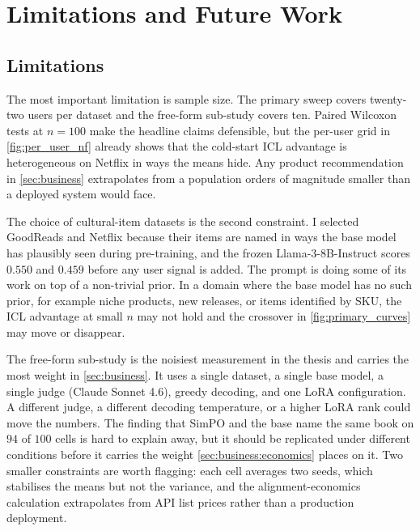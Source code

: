 
\section{Limitations and Future Work}
\label{sec:limits}

\subsection{Limitations}
\label{sec:limits:lim}

The most important limitation is sample size. The primary sweep covers twenty-two users per dataset and the free-form sub-study covers ten. Paired Wilcoxon tests at $n = 100$ make the headline claims defensible, but the per-user grid in \cref{fig:per_user_nf} already shows that the cold-start ICL advantage is heterogeneous on Netflix in ways the means hide. Any product recommendation in \cref{sec:business} extrapolates from a population orders of magnitude smaller than a deployed system would face.

The choice of cultural-item datasets is the second constraint. I selected GoodReads and Netflix because their items are named in ways the base model has plausibly seen during pre-training, and the frozen Llama-3-8B-Instruct scores $0.550$ and $0.459$ before any user signal is added. The prompt is doing some of its work on top of a non-trivial prior. In a domain where the base model has no such prior, for example niche products, new releases, or items identified by SKU, the ICL advantage at small $n$ may not hold and the crossover in \cref{fig:primary_curves} may move or disappear.

The free-form sub-study is the noisiest measurement in the thesis and carries the most weight in \cref{sec:business}. It uses a single dataset, a single base model, a single judge (Claude Sonnet 4.6), greedy decoding, and one LoRA configuration. A different judge, a different decoding temperature, or a higher LoRA rank could move the numbers. The finding that SimPO and the base name the same book on $94$ of $100$ cells is hard to explain away, but it should be replicated under different conditions before it carries the weight \cref{sec:business:economics} places on it. Two smaller constraints are worth flagging: each cell averages two seeds, which stabilises the means but not the variance, and the alignment-economics calculation extrapolates from API list prices rather than a production deployment.

